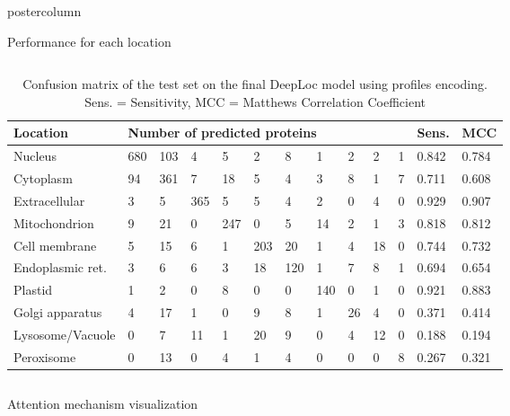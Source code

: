 ﻿\documentclass[final,hyperref={pdfpagelabels=false}]{beamer}
\begin{document}
\begin{frame}
\begin{columns}
\begin{column}{.49\paperwidth}
\begin{beamercolorbox}[center,wd=\textwidth]{postercolumn}
\begin{minipage}[T]{.99\textwidth}
{\begin{block}{Performance for each location}
\begin{columns}
\begin{column}{1\textwidth}
\begin{minipage}[t]{.95\textwidth}
\vspace{-1cm}
\begin{table}[h]
\small
\caption{Confusion matrix of the test set on the final DeepLoc model using profiles encoding. Sens. = Sensitivity, MCC = Matthews Correlation Coefficient}
\begin{tabular}{p{8cm}p{2cm}p{2cm}p{2cm}p{2cm}p{2cm}p{2cm}p{2cm}p{2cm}p{2cm}p{2cm}p{2.5cm}p{2.5cm}}
\toprule
Location      & \multicolumn{10}{l}{Number of predicted proteins}        & Sens. & MCC \\
\midrule
Nucleus          & 680 & 103 & 4   & 5   & 2   & 8   & 1   & 2  & 2 & 1 & 0.842 & 0.784 \\
Cytoplasm         & 94  & 361 &  7  & 18  & 5   & 4   & 3   & 8  & 1 & 7 & 0.711 & 0.608 \\
Extracellular    & 3   & 5   & 365 &  5  & 5   & 4   & 2   & 0  & 4 & 0 & 0.929 & 0.907 \\
Mitochondrion     & 9   & 21  & 0   & 247 &  0  & 5   & 14  & 2  & 1 & 3 & 0.818 & 0.812 \\
Cell membrane     & 5   & 15  & 6   & 1   & 203 & 20  & 1   & 4  & 18& 0 & 0.744 & 0.732 \\
Endoplasmic ret.               & 3   & 6   & 6   & 3   & 18  & 120 &  1  & 7  & 8 & 1 & 0.694 & 0.654 \\
Plastid           & 1   & 2   & 0   & 8   & 0   & 0   & 140 &  0 & 1 & 0 & 0.921 & 0.883 \\
Golgi apparatus  & 4   & 17  & 1   & 0   & 9   & 8   & 1   & 26 & 4 & 0 & 0.371 & 0.414 \\
Lysosome/Vacuole & 0   & 7   & 11  & 1   & 20  & 9   & 0   & 4  & 12& 0 & 0.188 & 0.194 \\
Peroxisome       & 0   & 13  & 0   & 4   & 1   & 4   & 0   & 0  & 0 & 8 & 0.267 & 0.321 \\
\bottomrule

\end{tabular}
\end{table}


\end{minipage}

\end{column}
\end{columns}
\end{block}

\vfill

\begin{block}{Attention mechanism visualization}

\begin{columns}
\begin{column}{1\textwidth}


\end{column}
\end{columns}
\end{block}}
\end{minipage}
\end{beamercolorbox}
\end{column}
\end{columns}
\end{frame}
\end{document}

